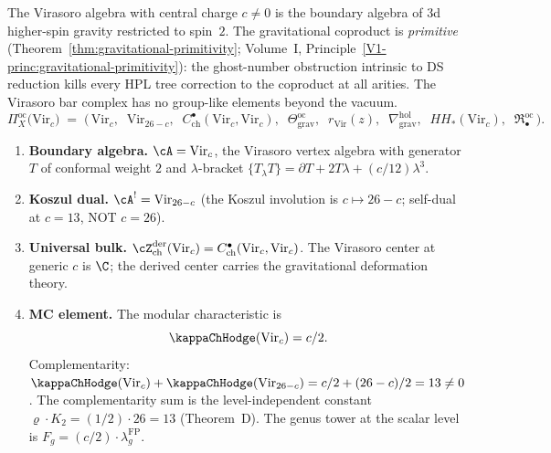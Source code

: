 \begin{computation}
\label{comp:platonic-gravity}
The Virasoro algebra with central charge $c \ne 0$ is the
boundary algebra of 3d higher-spin gravity restricted to
spin~$2$. The gravitational coproduct
is \emph{primitive}
(Theorem~\ref{thm:gravitational-primitivity};
Volume~I, Principle~\ref*{V1-princ:gravitational-primitivity}):
the ghost-number obstruction intrinsic to DS reduction kills
every HPL tree correction to the coproduct at all arities.
The Virasoro bar complex has no group-like elements beyond
the vacuum.
\begin{equation}\label{eq:platonic-Vir}
\Pi^{\mathrm{oc}}_X\!\bigl(\mathrm{Vir}_c\bigr)
\;=\;
\bigl(\,
\mathrm{Vir}_c,\;\;
\mathrm{Vir}_{26-c},\;\;
C^\bullet_{\mathrm{ch}}(\mathrm{Vir}_c, \mathrm{Vir}_c),\;\;
\Theta^{\mathrm{oc}}_{\mathrm{grav}},\;\;
r_{\mathrm{Vir}}(z),\;\;
\nabla^{\mathrm{hol}}_{\mathrm{grav}},\;\;
HH_*(\mathrm{Vir}_c),\;\;
\mathfrak{R}^{\mathrm{oc}}_\bullet
\,\bigr).
\end{equation}
\begin{enumerate}[label=\textup{(\roman*)},nosep]
\item \textbf{Boundary algebra.}
 $\cA = \mathrm{Vir}_c$, the Virasoro vertex algebra with
 generator $T$ of conformal weight $2$ and $\lambda$-bracket
 $\{T_\lambda T\} = \partial T + 2T\lambda + (c/12)\lambda^3$.

\item \textbf{Koszul dual.}
 $\cA^! = \mathrm{Vir}_{26-c}$
 \textup{(}the Koszul involution is $c \mapsto 26 - c$;
 self-dual at $c = 13$, NOT $c = 26$\textup{)}.

\item \textbf{Universal bulk.}
 $\cZ^{\mathrm{der}}_{\mathrm{ch}}(\mathrm{Vir}_c)
 = C^\bullet_{\mathrm{ch}}(\mathrm{Vir}_c, \mathrm{Vir}_c)$.
 The Virasoro center at generic $c$ is $\C$; the derived center
 carries the gravitational deformation theory.

\item \textbf{MC element.}
 The modular characteristic is
 \begin{equation}\label{eq:platonic-kappa-Vir}
 \kappaChHodge(\mathrm{Vir}_c) = c/2.
 \end{equation}
 Complementarity:
 $\kappaChHodge(\mathrm{Vir}_c) + \kappaChHodge(\mathrm{Vir}_{26-c})
 = c/2 + (26-c)/2 = 13 \ne 0$.
 The complementarity sum is the level-independent constant
 $\varrho \cdot K_2 = (1/2) \cdot 26 = 13$
 \textup{(}Theorem~\textup{D}\textup{)}.
 The genus tower at the scalar level is $F_g = (c/2) \cdot \lambda_g^{\mathrm{FP}}$.


\end{enumerate}
\end{computation}
